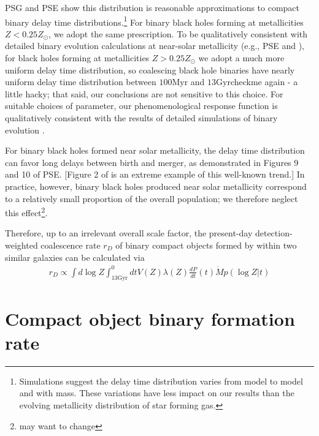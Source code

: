 \documentclass[nofootinbib,twocolumn,prd]{emulateapj}
\newcommand\editremark[1]{{\color{red}#1}}
\newcommand\unit[1]{\text{#1}}
\newcommand\abbrvPSgrb{PSG}
\newcommand\abbrvPSellipticals{PSE}
\begin{document}
\abbrvPSgrb{} and \abbrvPSellipticals{} show this distribution is reasonable approximations to compact binary delay
time distributions.\footnote{Simulations suggest the delay time distribution varies from model to model and with mass.
  These variations have less impact on our results than the evolving metallicity distribution of star forming gas.}
%
For binary black holes forming at metallicities $Z<0.25 Z_\odot$, we adopt the same prescription.  To be qualitatively consistent
with detailed binary evolution calculations at near-solar metallicity (e.g., \abbrvPSellipticals{} and
\cite{gwastro-EventPopsynPaper-2016}), for 
black holes forming at metallicities $Z>0.25 Z_\odot$ we adopt a much more uniform delay time distribution, so 
coalescing black hole binaries have nearly uniform delay time distribution between $100\unit{Myr}$ and
$13\unit{Gyr}$\editremark{checkme again - a little hacky}; that said,  our conclusions are not sensitive to this choice.
%
For suitable choices of parameter, our phenomenological response function is qualitatively consistent with the results of detailed simulations of binary
evolution  \citep{2010ApJ...715L.138B,popsyn-LowMetallicityImpact2c-StarTrackRevised-2014,popsyn-LowMetallicityImpact2b-StarTrackRevised-2013,popsyn-LowMetallicityImpact2-StarTrackRevised-2012}.


For binary black holes formed near solar metallicity, the delay time distribution can favor long delays between birth
and merger, as demonstrated in Figures 9 and 10 of \abbrvPSellipticals{}.  [Figure 2 of  \cite{2016arXiv160508783L} is
  an extreme example of this well-known trend.]  In practice, however, binary black holes produced near solar
metallicity correspond to a relatively small proportion of the overall population; we therefore neglect this
effect\footnote{may want to change}.


Therefore, up to an irrelevant overall scale factor, the  present-day detection-weighted coalescence rate $r_D$  of binary compact objects formed by within two similar
galaxies  can be calculated via
\begin{eqnarray}
 r_D \propto  \int d\log Z  \int _{13 \unit{Gyr}}^0dt  V(Z) \lambda(Z) \frac{dP}{dt}(t) \dot{M} p(\log Z|t)
\end{eqnarray}


\section{Compact object binary formation rate}
\label{sec:results:BBH}
\end{document}
